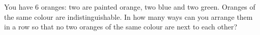You have $6$ oranges: two are painted orange, two blue and two green. Oranges of the same colour are indistinguishable. In how many ways can you arrange them in a row so that no two oranges of the same colour are next to each other?
